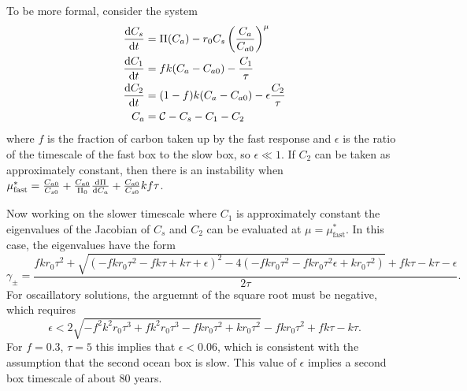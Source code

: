To be more formal, consider the system
\begin{subequations}
  \begin{align}
    \label{eq:two_box_ocean}
    \dv{C_s}{t} &= \Pi(C_a) - r_0 C_s \left(\frac{C_a}{C_{a0}}\right)^{\mu} \\
    \dv{C_1}{t} &= fk(C_a - C_{a0}) - \frac{C_1}{\tau} \\
    \dv{C_2}{t} &= (1-f)k(C_a-C_{a0}) - \epsilon\frac{C_2}{\tau} \\
    C_a &= \mathcal{C} - C_s - C_1 - C_2
  \end{align}
\end{subequations}
where $f$ is the fraction of carbon taken up by the fast response and $\epsilon$ is the ratio of the timescale of the fast box to the slow box, so $\epsilon \ll 1$. If
$C_2$ can be taken as approximately constant, then there is an instability when $\mu^*_{\mathrm{fast}} = \frac{C_{a0}}{C_{s0}} + \frac{C_{a0}}{\Pi_0} \dv{\Pi}{C_a} + \frac{C_{a0}}{C_{s0}} kf\tau$.

Now working on the slower timescale where $C_1$ is approximately constant the eigenvalues of the Jacobian of $C_s$ and $C_2$ can be evaluated at $\mu = \mu^*_{\mathrm{fast}}$. In this case, the eigenvalues
have the form
\begin{equation}
  \label{eq:slow_eigenvalues}
  \gamma_{\pm} = \frac{f k r_0 \tau ^2+\sqrt{\left(-f k r_0 \tau ^2-f k \tau +k \tau +\epsilon \right)^2-4 \left(-f k r_0 \tau ^2-f k r_0 \tau ^2 \epsilon +k r_0 \tau ^2\right)}+f k \tau -k \tau -\epsilon }
  {2 \tau }.
\end{equation}
For oscaillatory solutions, the arguemnt of the square root must be negative, which requires
\begin{equation}
  \label{eq:epsilon_requirement}
  \epsilon < 2 \sqrt{-f^2 k^2 r_0 \tau ^3+f k^2 r_0 \tau ^3-f k r_0 \tau ^2+k r_0 \tau ^2}-f k r_0 \tau ^2+f k \tau -k \tau.
\end{equation}
For $f = 0.3$, $\tau = 5$ this implies that $\epsilon < 0.06$, which is consistent with the assumption that the second ocean box is slow. This value of $\epsilon$ implies a second box timescale
of about 80 years.
